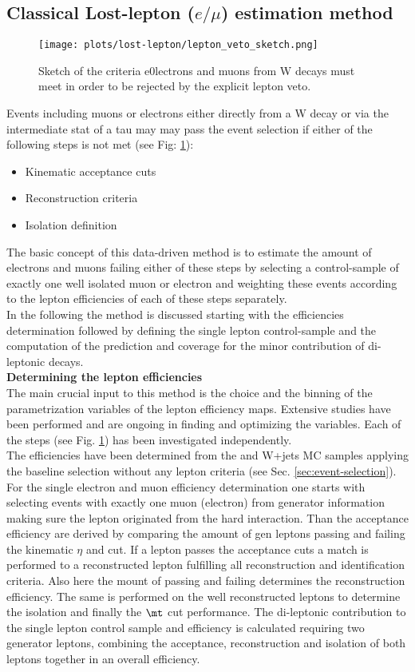\subsection{Classical Lost-lepton ($e/\mu$) estimation method}
\label{sec:lost-leptons}
\begin{figure}[h]
  \centering
  \texttt{[image: plots/lost-lepton/lepton\_veto\_sketch.png]}
  \caption{Sketch of the criteria e0lectrons and muons from W decays must meet in order to be rejected by the explicit lepton veto.}
  \label{fig:lost-lepton-scatch}
\end{figure}
Events including muons or electrons either directly from a W decay or via the intermediate stat of a tau may may pass the event selection if either of the following steps is not met (see Fig: \ref{fig:lost-lepton-scatch}):
\begin{itemize}
\item Kinematic acceptance cuts
\item Reconstruction criteria
\item Isolation definition
\end{itemize}
The basic concept of this data-driven method is to estimate the amount of electrons and muons failing either of these steps by selecting a control-sample of exactly one well isolated muon or electron and weighting these events according to the lepton efficiencies of each of these steps separately.\\
In the following the method is discussed starting with the efficiencies determination followed by defining the single lepton control-sample and the computation of the prediction and coverage for the minor contribution of di-leptonic \ttbar decays.\\
{\bf Determining the lepton efficiencies}\\
The main crucial input to this method is the choice and the binning of the parametrization variables of the lepton efficiency maps. Extensive studies have been performed and are ongoing in finding and optimizing the variables. Each of the steps (see Fig. \ref{fig:lost-lepton-scatch}) has been investigated independently.\\
The efficiencies have been determined from the \ttbar and W+jets MC samples applying the baseline selection without any lepton criteria (see Sec. \ref{sec:event-selection}).
For the single electron and muon efficiency determination one starts with selecting events with exactly one muon (electron) from generator information making sure the lepton originated from the hard interaction. Than the acceptance efficiency are derived by comparing the amount of gen leptons passing and failing the kinematic $\eta$ and \pt cut. If a lepton passes the acceptance cuts a match is performed to a reconstructed lepton fulfilling all reconstruction and identification criteria. Also here the mount of passing and failing determines the reconstruction efficiency. The same is performed on the well reconstructed leptons to determine the isolation and finally the $\mt$ cut performance. The di-leptonic contribution  to the single lepton control sample and efficiency is calculated requiring two generator leptons, combining the acceptance, reconstruction and isolation of both leptons together in an overall efficiency.\\
